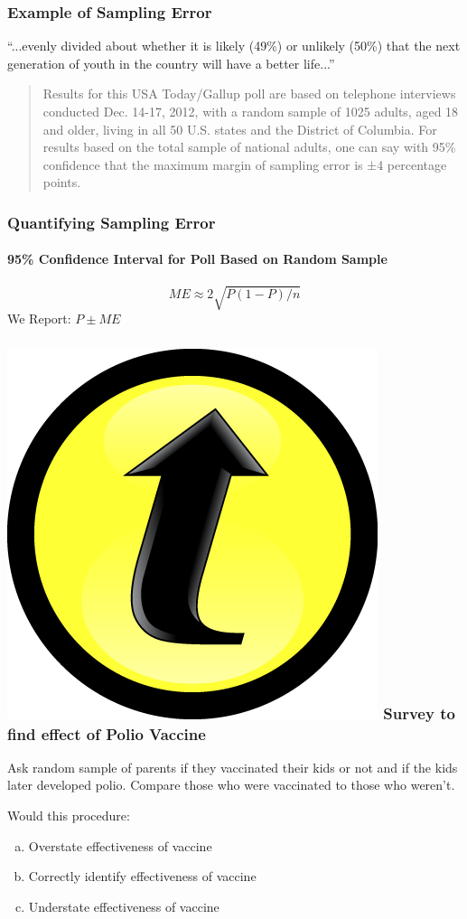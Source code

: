 \documentclass[handout]{beamer}
\begin{document}
\begin{frame}
\frametitle{Example of Sampling Error}
``...evenly divided about whether it is likely (49\%) or unlikely (50\%) that the next generation of youth in the country will have a better life...''

\vspace{2em}
\begin{quote}
Results for this USA Today/Gallup poll are based on telephone interviews conducted Dec. 14-17, 2012, with a \alert{random sample of 1025 adults}, aged 18 and older, living in all 50 U.S. states and the District of Columbia. For results based on the total sample of national adults, one can say with \alert{95\% confidence that the maximum margin of sampling error is ±4 percentage points}.
\end{quote}
\end{frame}
\begin{frame}
\frametitle{Quantifying Sampling Error}
\framesubtitle{95\% Confidence Interval for Poll Based on Random Sample}
	$$ME \approx 2 \sqrt{P(1-P)/n}$$
	We Report: $P \pm ME$
\end{frame}

\begin{frame}
\frametitle{\includegraphics[scale = 0.05]{./images/clicker} \hfill Survey to find effect of Polio Vaccine}
Ask random sample of parents if they vaccinated their kids or not and if the kids later developed polio. Compare those who were vaccinated to those who weren't.

\vspace{1em}


Would this procedure:
	\begin{enumerate}[(a)]
		\item Overstate effectiveness of vaccine
		\item Correctly identify effectiveness of vaccine
		\item Understate effectiveness of vaccine
	\end{enumerate}

\end{frame}
\end{document}
